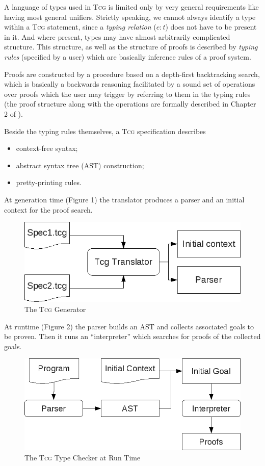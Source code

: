 \documentclass[a4paper,12pt]{article}
\newcommand{\Tcg}{\textsc{Tcg}}
\begin{document}
A language of types used in \Tcg{} is limited only by very general requirements like having most general unifiers. Strictly speaking, we cannot always identify a type within a \Tcg{} statement, since a \emph{typing relation} ($e : t$) does not have to be present in it. And where present, types may have almost arbitrarily complicated structure. This structure, as well as the structure of proofs is described by \emph{typing rules} (specified by a user) which are basically inference rules of a proof system. 

Proofs are constructed by a procedure based on a depth-first backtracking search, which is basically a backwards reasoning facilitated by a sound set of operations over proofs which the user may trigger by referring to them in the typing rules (the proof structure along with the operations are formally described in Chapter 2 of \cite{Tcg}).

Beside the typing rules themselves, a \Tcg{} specification describes
\begin{itemize}
	\item context-free syntax;
	\item abstract syntax tree (AST) construction;
	\item pretty-printing rules.
\end{itemize}
At generation time (Figure 1) the translator produces a parser and an initial context for the proof search.

\begin{figure}[htp]
\centering
\includegraphics[width=.7\textwidth]{generator.png}
\caption{The \Tcg{} Generator}
\end{figure}

At runtime (Figure 2) the parser builds an AST and collects associated goals to be proven. Then it runs an ``interpreter'' which searches for proofs of the collected goals.

\begin{figure}[htp]
\centering
\includegraphics[width=.7\textwidth]{runtime.png}
\caption{The \Tcg{} Type Checker at Run Time}
\end{figure}
\end{document}
